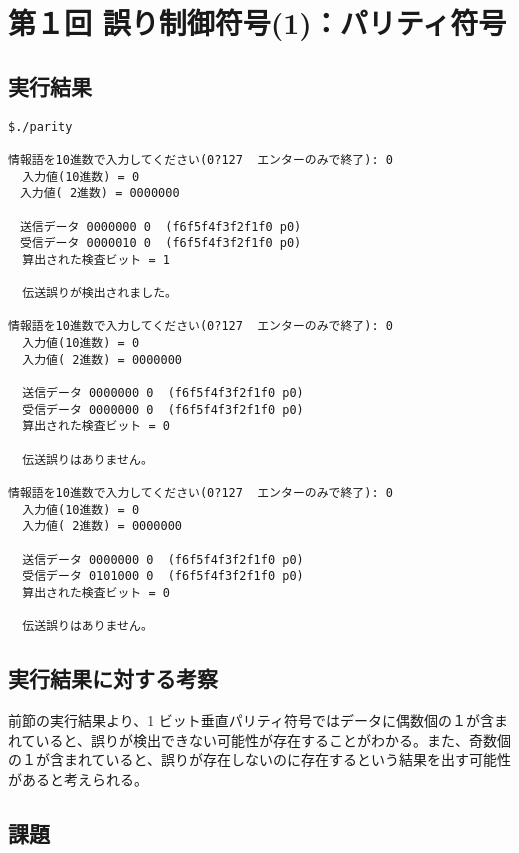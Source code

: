\documentclass[a4j]{celb-report}
\author{木戸 喜隆}
\date{2017年5月X日}
\begin{document}
\maketitle

\section{第１回 誤り制御符号(1)：パリティ符号}
\subsection{実行結果}

\begin{lstlisting}[basicstyle=\ttfamily\footnotesize, frame=single]
$./parity

情報語を10進数で入力してください(0?127  エンターのみで終了): 0
  入力値(10進数) = 0
　入力値( 2進数) = 0000000

　送信データ 0000000 0  (f6f5f4f3f2f1f0 p0)
　受信データ 0000010 0  (f6f5f4f3f2f1f0 p0)
  算出された検査ビット = 1

  伝送誤りが検出されました。

情報語を10進数で入力してください(0?127  エンターのみで終了): 0
  入力値(10進数) = 0
  入力値( 2進数) = 0000000

  送信データ 0000000 0  (f6f5f4f3f2f1f0 p0)
  受信データ 0000000 0  (f6f5f4f3f2f1f0 p0)
  算出された検査ビット = 0

  伝送誤りはありません。

情報語を10進数で入力してください(0?127  エンターのみで終了): 0
  入力値(10進数) = 0
  入力値( 2進数) = 0000000

  送信データ 0000000 0  (f6f5f4f3f2f1f0 p0)
  受信データ 0101000 0  (f6f5f4f3f2f1f0 p0)
  算出された検査ビット = 0

  伝送誤りはありません。

\end{lstlisting}

\subsection{実行結果に対する考察}
前節の実行結果より、1 ビット垂直パリティ符号ではデータに偶数個の１が含まれていると、誤りが検出できない可能性が存在することがわかる。また、奇数個の１が含まれていると、誤りが存在しないのに存在するという結果を出す可能性があると考えられる。

\subsection{課題}
\end{document}
